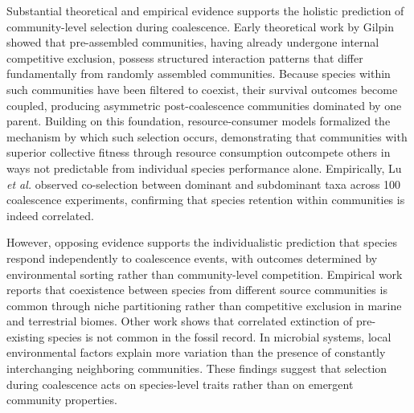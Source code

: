 Substantial theoretical and empirical evidence supports the holistic prediction of community-level selection during coalescence. Early theoretical work by Gilpin\citep{Gilpin1994} showed that pre-assembled communities, having already undergone internal competitive exclusion, possess structured interaction patterns that differ fundamentally from randomly assembled communities. Because species within such communities have been filtered to coexist, their survival outcomes become coupled, producing asymmetric post-coalescence communities dominated by one parent. Building on this foundation, resource-consumer models formalized the mechanism by which such selection occurs, demonstrating that communities with superior collective fitness through resource consumption outcompete others in ways not predictable from individual species performance alone\citep{Tikhonov2016, Lechon2021}. Empirically, Lu \textit{et al.}\citep{Lu2022} observed co-selection between dominant and subdominant taxa across 100 coalescence experiments, confirming that species retention within communities is indeed correlated.

However, opposing evidence supports the individualistic prediction that species respond independently to coalescence events, with outcomes determined by environmental sorting rather than community-level competition. Empirical work reports that coexistence between species from different source communities is common through niche partitioning rather than competitive exclusion in marine and terrestrial biomes\citep{Vermeij1991}. Other work shows that correlated extinction of pre-existing species is not common in the fossil record\citep{BentonEmerson2007}. In microbial systems, local environmental factors explain more variation than the presence of constantly interchanging neighboring communities\citep{VanderGucht2007}.  These findings suggest that selection during coalescence acts on species-level traits rather than on emergent community properties.

